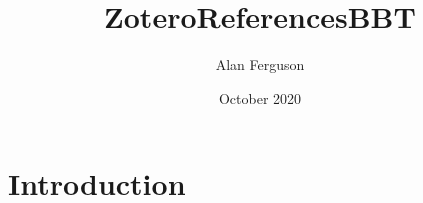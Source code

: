 \documentclass{article}
\title{ZoteroReferencesBBT}
\author{Alan Ferguson}
\date{October 2020}
\begin{document}
\maketitle

\section{Introduction}
\end{document}
